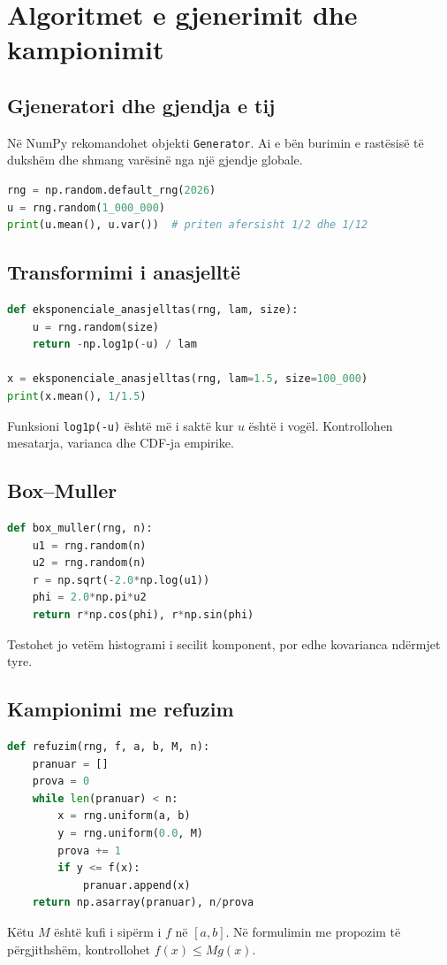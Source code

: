 \section{Algoritmet e gjenerimit dhe kampionimit}
\subsection{Gjeneratori dhe gjendja e tij}
Në NumPy rekomandohet objekti \texttt{Generator}. Ai e bën burimin e rastësisë të dukshëm dhe shmang varësinë nga një gjendje globale.
\begin{lstlisting}[language=Python]
rng = np.random.default_rng(2026)
u = rng.random(1_000_000)
print(u.mean(), u.var())  # priten afersisht 1/2 dhe 1/12
\end{lstlisting}

\subsection{Transformimi i anasjelltë}
\begin{lstlisting}[language=Python,caption={Mostra eksponenciale pa përdorur funksionin e gatshëm.}]
def eksponenciale_anasjelltas(rng, lam, size):
    u = rng.random(size)
    return -np.log1p(-u) / lam

x = eksponenciale_anasjelltas(rng, lam=1.5, size=100_000)
print(x.mean(), 1/1.5)
\end{lstlisting}
Funksioni \texttt{log1p(-u)} është më i saktë kur $u$ është i vogël. Kontrollohen mesatarja, varianca dhe CDF-ja empirike.

\subsection{Box--Muller}
\begin{lstlisting}[language=Python,caption={Gjenerimi i çifteve Gauss standarde.}]
def box_muller(rng, n):
    u1 = rng.random(n)
    u2 = rng.random(n)
    r = np.sqrt(-2.0*np.log(u1))
    phi = 2.0*np.pi*u2
    return r*np.cos(phi), r*np.sin(phi)
\end{lstlisting}
Testohet jo vetëm histogrami i secilit komponent, por edhe kovarianca ndërmjet tyre.

\subsection{Kampionimi me refuzim}
\begin{lstlisting}[language=Python,caption={Refuzimi për një dendësi në interval të fundmë.}]
def refuzim(rng, f, a, b, M, n):
    pranuar = []
    prova = 0
    while len(pranuar) < n:
        x = rng.uniform(a, b)
        y = rng.uniform(0.0, M)
        prova += 1
        if y <= f(x):
            pranuar.append(x)
    return np.asarray(pranuar), n/prova
\end{lstlisting}
Këtu $M$ është kufi i sipërm i $f$ në $[a,b]$. Në formulimin me propozim të përgjithshëm, kontrollohet $f(x)\le M g(x)$.

